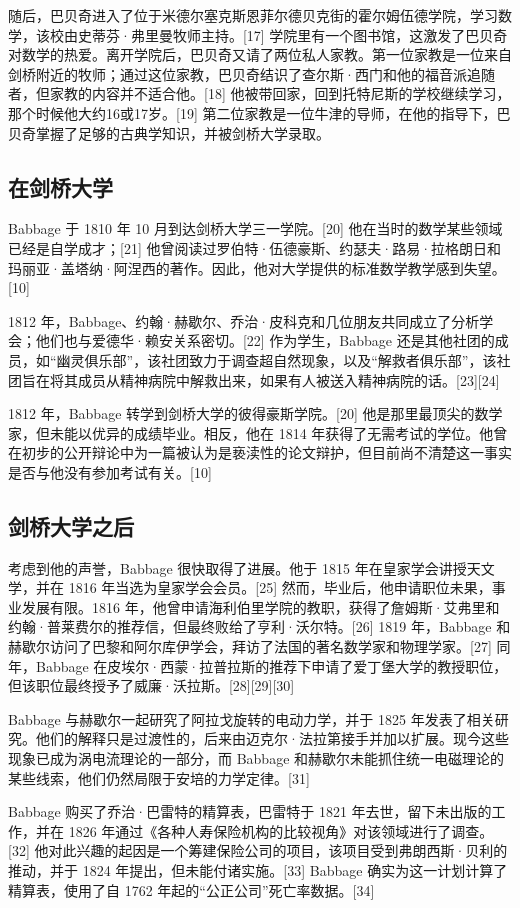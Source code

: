 随后，巴贝奇进入了位于米德尔塞克斯恩菲尔德贝克街的霍尔姆伍德学院，学习数学，该校由史蒂芬·弗里曼牧师主持。[17] 学院里有一个图书馆，这激发了巴贝奇对数学的热爱。离开学院后，巴贝奇又请了两位私人家教。第一位家教是一位来自剑桥附近的牧师；通过这位家教，巴贝奇结识了查尔斯·西门和他的福音派追随者，但家教的内容并不适合他。[18] 他被带回家，回到托特尼斯的学校继续学习，那个时候他大约16或17岁。[19] 第二位家教是一位牛津的导师，在他的指导下，巴贝奇掌握了足够的古典学知识，并被剑桥大学录取。
\subsection{在剑桥大学}
Babbage 于 1810 年 10 月到达剑桥大学三一学院。[20] 他在当时的数学某些领域已经是自学成才；[21] 他曾阅读过罗伯特·伍德豪斯、约瑟夫·路易·拉格朗日和玛丽亚·盖塔纳·阿涅西的著作。因此，他对大学提供的标准数学教学感到失望。[10]

1812 年，Babbage、约翰·赫歇尔、乔治·皮科克和几位朋友共同成立了分析学会；他们也与爱德华·赖安关系密切。[22] 作为学生，Babbage 还是其他社团的成员，如“幽灵俱乐部”，该社团致力于调查超自然现象，以及“解救者俱乐部”，该社团旨在将其成员从精神病院中解救出来，如果有人被送入精神病院的话。[23][24]

1812 年，Babbage 转学到剑桥大学的彼得豪斯学院。[20] 他是那里最顶尖的数学家，但未能以优异的成绩毕业。相反，他在 1814 年获得了无需考试的学位。他曾在初步的公开辩论中为一篇被认为是亵渎性的论文辩护，但目前尚不清楚这一事实是否与他没有参加考试有关。[10]
\subsection{剑桥大学之后} 
考虑到他的声誉，Babbage 很快取得了进展。他于 1815 年在皇家学会讲授天文学，并在 1816 年当选为皇家学会会员。[25] 然而，毕业后，他申请职位未果，事业发展有限。1816 年，他曾申请海利伯里学院的教职，获得了詹姆斯·艾弗里和约翰·普莱费尔的推荐信，但最终败给了亨利·沃尔特。[26] 1819 年，Babbage 和赫歇尔访问了巴黎和阿尔库伊学会，拜访了法国的著名数学家和物理学家。[27] 同年，Babbage 在皮埃尔·西蒙·拉普拉斯的推荐下申请了爱丁堡大学的教授职位，但该职位最终授予了威廉·沃拉斯。[28][29][30]

Babbage 与赫歇尔一起研究了阿拉戈旋转的电动力学，并于 1825 年发表了相关研究。他们的解释只是过渡性的，后来由迈克尔·法拉第接手并加以扩展。现今这些现象已成为涡电流理论的一部分，而 Babbage 和赫歇尔未能抓住统一电磁理论的某些线索，他们仍然局限于安培的力学定律。[31]

Babbage 购买了乔治·巴雷特的精算表，巴雷特于 1821 年去世，留下未出版的工作，并在 1826 年通过《各种人寿保险机构的比较视角》对该领域进行了调查。[32] 他对此兴趣的起因是一个筹建保险公司的项目，该项目受到弗朗西斯·贝利的推动，并于 1824 年提出，但未能付诸实施。[33] Babbage 确实为这一计划计算了精算表，使用了自 1762 年起的“公正公司”死亡率数据。[34]


